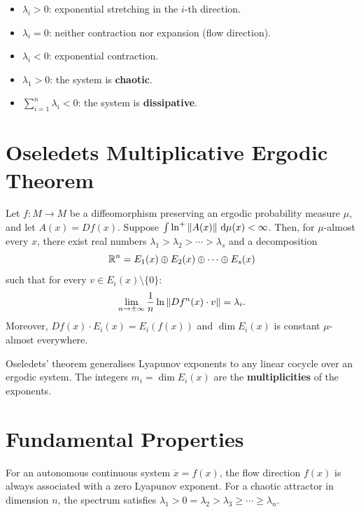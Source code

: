 \begin{keyformulas}[title=\textbf{Geometric Interpretation of the Exponents}]
\begin{itemize}
    \item $\lambda_i > 0$: exponential stretching in the $i$-th direction.
    \item $\lambda_i = 0$: neither contraction nor expansion (flow direction).
    \item $\lambda_i < 0$: exponential contraction.
    \item $\lambda_1 > 0$: the system is \textbf{chaotic}.
    \item $\sum_{i=1}^n \lambda_i < 0$: the system is \textbf{dissipative}.
\end{itemize}
\end{keyformulas}

\section{Oseledets Multiplicative Ergodic Theorem}

\begin{theorem}[Oseledets, 1968]
\label{thm:oseledets}
Let $f : M \to M$ be a diffeomorphism preserving an ergodic probability
measure $\mu$, and let $A(x) = Df(x)$. Suppose
$\int \ln^+ \left\| A(x) \right\|\,\mathrm{d}\mu(x) < \infty$. Then, for $\mu$-almost
every $x$, there exist real numbers
$\lambda_1 > \lambda_2 > \cdots > \lambda_s$ and a decomposition
\[
    \mathbb{R}^n = E_1(x) \oplus E_2(x) \oplus \cdots \oplus E_s(x)
\]
such that for every $v \in E_i(x) \setminus \{0\}$:
\[
    \lim_{n \to \pm\infty} \frac{1}{n}\ln\left\| Df^n(x) \cdot v \right\| = \lambda_i.
\]
Moreover, $Df(x) \cdot E_i(x) = E_i(f(x))$ and $\dim E_i(x)$ is constant
$\mu$-almost everywhere.
\end{theorem}

\begin{remark}
Oseledets' theorem generalises Lyapunov exponents to any linear cocycle over
an ergodic system. The integers $m_i = \dim E_i(x)$ are the
\textbf{multiplicities} of the exponents.
\end{remark}

\section{Fundamental Properties}

\begin{proposition}
For an autonomous continuous system $\dot{x} = f(x)$, the flow direction
$f(x)$ is always associated with a zero Lyapunov exponent. For a chaotic
attractor in dimension $n$, the spectrum satisfies
$\lambda_1 > 0 = \lambda_2 > \lambda_3 \geq \cdots \geq \lambda_n$.
\end{proposition}

